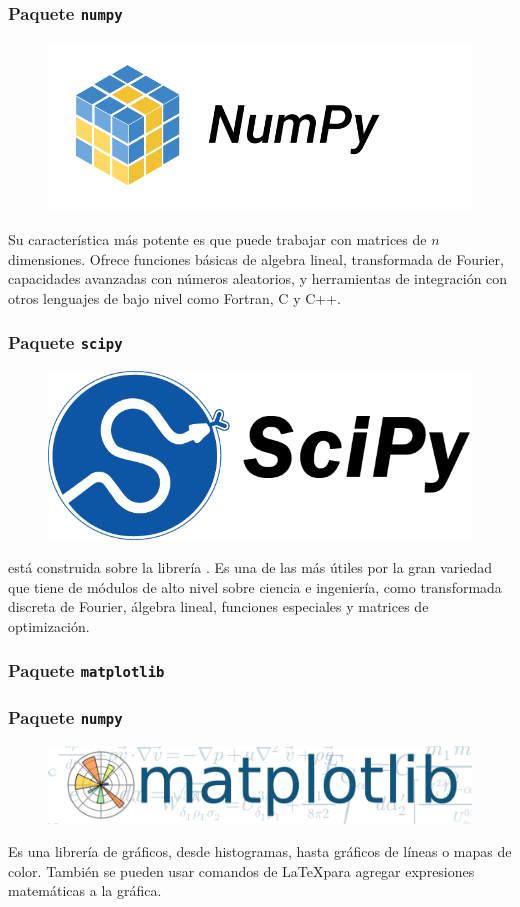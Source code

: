 \begin{frame}
\frametitle{Paquete \texttt{numpy}}
\begin{figure}
    \includegraphics[scale=0.15]{./Imagenes/numpy.png}
\end{figure}
Su característica más potente es que puede trabajar con matrices de $n$ dimensiones. Ofrece funciones básicas de algebra lineal, transformada de Fourier, capacidades avanzadas con números aleatorios, y herramientas de integración con otros lenguajes de bajo nivel como Fortran, C y C++.
\end{frame}
\begin{frame}
\frametitle{Paquete \texttt{scipy}}
\begin{figure}
    \includegraphics[scale=0.15]{./Imagenes/scipy.png}
\end{figure}
 está construida sobre la librería . Es una de las más útiles por la gran variedad que tiene de módulos de alto nivel sobre ciencia e ingeniería, como transformada discreta de Fourier, álgebra lineal, funciones especiales y matrices de optimización.
\end{frame}
\begin{frame}
\frametitle{Paquete \texttt{matplotlib}}
\frametitle{Paquete \texttt{numpy}}
\begin{figure}
    \includegraphics[scale=0.15]{./Imagenes/matplotlib.png}
\end{figure}
Es una librería de gráficos, desde histogramas, hasta gráficos de líneas o mapas de color. También se pueden usar comandos de \LaTeX para agregar expresiones matemáticas a la gráfica.
\end{frame}
